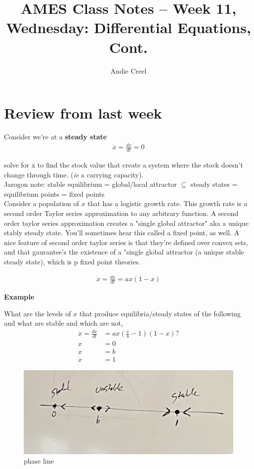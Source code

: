 \documentclass{article}
\title{AMES Class Notes -- Week 11, Wednesday: Differential Equations, Cont.}
\author{Andie Creel}
\begin{document}
\maketitle

\section{Review from last week}
Consider we're at a \textbf{steady state} 
\begin{align*}
    \dot x = \frac{dx}{dt} = 0 
\end{align*}

solve for x to find the stock value that create a system where the stock doesn't change through time. (\textit{ie} a carrying capacity). \\

Jarogon note: stable equilibrium =  global/local attractor $\subseteq$ steady states = equilibrium points  = fixed points \\

Consider a population of $x$ that has a logistic growth rate. This growth rate is a second order Taylor series approximation to any arbitrary function. A second order taylor series approximation creates a "single global attractor" aka a unique stably steady state. You'll sometimes hear this called a fixed point, as well. A nice feature of second order taylor series is that they're defined over convex sets, and that gaurantee's the existence of a "single global attractor (a unique stable steady state), which is p fixed point theories. 

\begin{align*}
    \dot x = \frac{dx}{dt} = ax( 1 - x) 
\end{align*}

\textbf{Example}

What are the levels of $x$ that produce equilibria/steady states of the following and what are stable and which are not, 
\begin{align*}
    \dot x = \frac{dx}{dt} &= ax (\frac{x}{b} -1)(1-x)?\\
    x &= 0\\
    x &= b \\
    x &= 1
\end{align*}

\begin{figure}[htp]
    \centering
    \includegraphics[width=0.5\linewidth]{Screen Shot 2023-11-15 at 11.03.06 AM.png}
    \caption{phase line}
    \label{fig:enter-label}
\end{figure}
\end{document}
